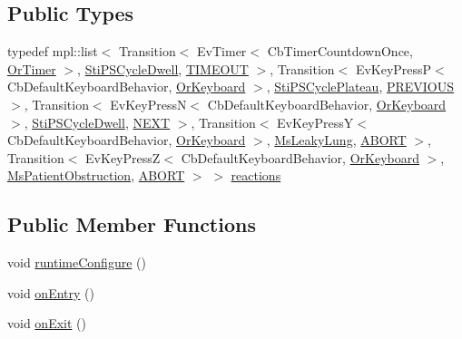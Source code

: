 \subsection*{Public Types}
\begin{DoxyCompactItemize}
\item 
typedef mpl\+::list$<$ Transition$<$ Ev\+Timer$<$ Cb\+Timer\+Countdown\+Once, \hyperlink{classsm__respira__1_1_1OrTimer}{Or\+Timer} $>$, \hyperlink{structsm__respira__1_1_1ps__cycle__inner__states_1_1StiPSCycleDwell}{Sti\+P\+S\+Cycle\+Dwell}, \hyperlink{structsm__respira__1_1_1ps__cycle__inner__states_1_1StiPSCycleExpire_1_1TIMEOUT}{T\+I\+M\+E\+O\+UT} $>$, Transition$<$ Ev\+Key\+PressP$<$ Cb\+Default\+Keyboard\+Behavior, \hyperlink{classsm__respira__1_1_1OrKeyboard}{Or\+Keyboard} $>$, \hyperlink{structsm__respira__1_1_1ps__cycle__inner__states_1_1StiPSCyclePlateau}{Sti\+P\+S\+Cycle\+Plateau}, \hyperlink{structsm__respira__1_1_1ps__cycle__inner__states_1_1StiPSCycleExpire_1_1PREVIOUS}{P\+R\+E\+V\+I\+O\+US} $>$, Transition$<$ Ev\+Key\+PressN$<$ Cb\+Default\+Keyboard\+Behavior, \hyperlink{classsm__respira__1_1_1OrKeyboard}{Or\+Keyboard} $>$, \hyperlink{structsm__respira__1_1_1ps__cycle__inner__states_1_1StiPSCycleDwell}{Sti\+P\+S\+Cycle\+Dwell}, \hyperlink{structsm__respira__1_1_1ps__cycle__inner__states_1_1StiPSCycleExpire_1_1NEXT}{N\+E\+XT} $>$, Transition$<$ Ev\+Key\+PressY$<$ Cb\+Default\+Keyboard\+Behavior, \hyperlink{classsm__respira__1_1_1OrKeyboard}{Or\+Keyboard} $>$, \hyperlink{classsm__respira__1_1_1MsLeakyLung}{Ms\+Leaky\+Lung}, \hyperlink{classABORT}{A\+B\+O\+RT} $>$, Transition$<$ Ev\+Key\+PressZ$<$ Cb\+Default\+Keyboard\+Behavior, \hyperlink{classsm__respira__1_1_1OrKeyboard}{Or\+Keyboard} $>$, \hyperlink{classsm__respira__1_1_1MsPatientObstruction}{Ms\+Patient\+Obstruction}, \hyperlink{classABORT}{A\+B\+O\+RT} $>$ $>$ \hyperlink{structsm__respira__1_1_1ps__cycle__inner__states_1_1StiPSCycleExpire_af06d5dccfc337830ff4b17405ff4ee7a}{reactions}
\end{DoxyCompactItemize}
\subsection*{Public Member Functions}
\begin{DoxyCompactItemize}
\item 
void \hyperlink{structsm__respira__1_1_1ps__cycle__inner__states_1_1StiPSCycleExpire_a164ac5aef7aed4a8ede77bcaa791787d}{runtime\+Configure} ()
\item 
void \hyperlink{structsm__respira__1_1_1ps__cycle__inner__states_1_1StiPSCycleExpire_afb125ac4117a2a63ae17b1c60cd863c1}{on\+Entry} ()
\item 
void \hyperlink{structsm__respira__1_1_1ps__cycle__inner__states_1_1StiPSCycleExpire_aa8c6ef8336825cbbdc885d2fc2b34b39}{on\+Exit} ()
\end{DoxyCompactItemize}
